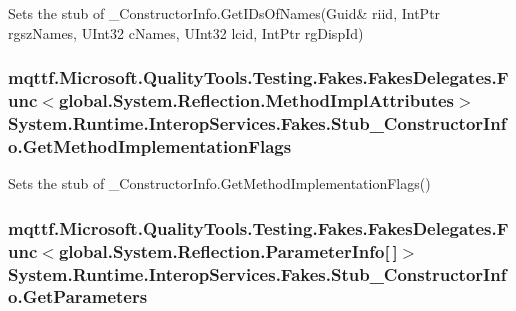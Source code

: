 Sets the stub of \-\_\-\-Constructor\-Info.\-Get\-I\-Ds\-Of\-Names(Guid\& riid, Int\-Ptr rgsz\-Names, U\-Int32 c\-Names, U\-Int32 lcid, Int\-Ptr rg\-Disp\-Id)

\hypertarget{class_system_1_1_runtime_1_1_interop_services_1_1_fakes_1_1_stub___constructor_info_a1a44c28ebf1d8caf62756157e8ab5b1c}{
\subsubsection[{Get\-Method\-Implementation\-Flags}]{\setlength{\rightskip}{0pt plus 5cm}mqttf.\-Microsoft.\-Quality\-Tools.\-Testing.\-Fakes.\-Fakes\-Delegates.\-Func$<$global.\-System.\-Reflection.\-Method\-Impl\-Attributes$>$ System.\-Runtime.\-Interop\-Services.\-Fakes.\-Stub\-\_\-\-Constructor\-Info.\-Get\-Method\-Implementation\-Flags}}\label{class_system_1_1_runtime_1_1_interop_services_1_1_fakes_1_1_stub___constructor_info_a1a44c28ebf1d8caf62756157e8ab5b1c}


Sets the stub of \-\_\-\-Constructor\-Info.\-Get\-Method\-Implementation\-Flags()

\hypertarget{class_system_1_1_runtime_1_1_interop_services_1_1_fakes_1_1_stub___constructor_info_af5a1a5a539ebb2e36a523ff23ed62243}{
\subsubsection[{Get\-Parameters}]{\setlength{\rightskip}{0pt plus 5cm}mqttf.\-Microsoft.\-Quality\-Tools.\-Testing.\-Fakes.\-Fakes\-Delegates.\-Func$<$global.\-System.\-Reflection.\-Parameter\-Info\mbox{[}$\,$\mbox{]}$>$ System.\-Runtime.\-Interop\-Services.\-Fakes.\-Stub\-\_\-\-Constructor\-Info.\-Get\-Parameters}}\label{class_system_1_1_runtime_1_1_interop_services_1_1_fakes_1_1_stub___constructor_info_af5a1a5a539ebb2e36a523ff23ed62243}


